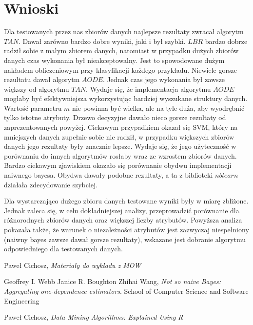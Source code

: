 \documentclass[16]{article}
\begin{document}
\section{Wnioski}
Dla testowanych przez nas zbiorów danych najlepsze rezultaty zwracał algorytm $TAN$. Dawał zarówno bardzo dobre wyniki, jaki i był szybki. $LBR$ bardzo dobrze radził sobie z małym zbiorem danych, natomiast w przypadku dużych zbiorów danych czas wykonania był nieakceptowalny. Jest to spowodowane dużym nakładem obliczeniowym przy klasyfikacji każdego przykładu. Niewiele gorsze rezultatu dawał algorytm $AODE$. Jednak czas jego wykonania był zawsze większy od algorytmu $TAN$. Wydaje się, że implementacja algorytmu $AODE$ mogłaby być efektywniejsza wykorzystując bardziej wyszukane struktury danych. Wartość parametru $m$ nie powinna być wielka, ale na tyle duża, aby wyodrębnić tylko istotne atrybuty. Drzewo decyzyjne dawało nieco gorsze rezultaty od zaprezentowanych powyżej. Ciekawym przypadkiem okazał się SVM, który na mniejszych danych zupełnie sobie nie radził, w przypadku większych zbiorów danych jego rezultaty były znacznie lepsze. Wydaje się, że jego użyteczność w porównaniu do innych algorytmów rosłaby wraz ze wzrostem zbiorów danych. Bardzo ciekawym zjawiskiem okazało się porównanie obydwu implementacji naiwnego bayesa. Obydwa dawały podobne rezultaty, a ta z biblioteki $nblearn$ działała zdecydowanie szybciej. 

Dla wystarczająco dużego zbioru danych testowane wyniki były w miarę zbliżone. Jednak zaleca się, w celu dokładniejszej analizy, przeprowadzić porównanie dla różnorodnych zbiorów danych oraz większej liczby atrybutów. Powyższa analiza pokazała także, że warunek o niezależności atrybutów jest zazwyczaj niespełniony (naiwny bayes zawsze dawał gorsze rezultaty), wskazane jest dobranie algorytmu odpowiedniego dla testowanych danych.

\begin{thebibliography}{9}
	
		Paweł Cichosz,
		\emph{Materiały do wykładu z MOW}
			
		Geoffrey I. Webb
		Janice R. Boughton
		Zhihai Wang,
		\emph{Not so naive Bayes: Aggregating one-dependence estimators}.
		School of Computer Science and Software Engineering
    
		Paweł Cichosz,
		\emph{Data Mining Algorithms: Explained Using R}
\end{thebibliography}
\end{document}
